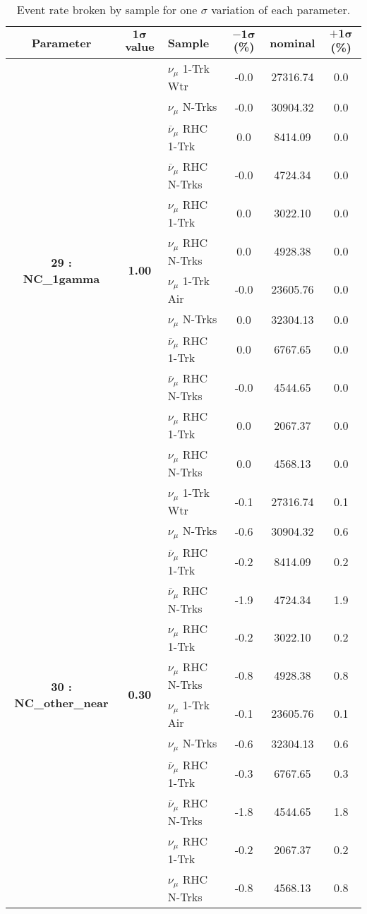 \addtocounter{table}{-1}
\begin{table}[ht!]
\centering
\begin{tabular}{ c  c  l  c  c  c }
\midrule[1.3pt]
\textbf{Parameter} & \textbf{$\mathbf{1\sigma}$ value} & \textbf{Sample} & \textbf{$\mathbf{-1\sigma}$ (\%)}  &  \textbf{nominal}  &  \textbf{$\mathbf{+1\sigma}$ (\%)} \\
\midrule[1.3pt]
\multirow{12}{*}{\textbf{29 : NC\_1gamma}} & \multirow{12}{*}{\textbf{1.00}} & $\nu_\mu$ 1-Trk Wtr &   -0.0 &  27316.74 &   0.0 \\ 
 &  & $\nu_\mu$ N-Trks &   -0.0 &  30904.32 &   0.0 \\ 
 &  & $\overline{\nu}_\mu$ RHC 1-Trk &   0.0 &  8414.09 &   0.0 \\ 
 &  & $\overline{\nu}_\mu$ RHC N-Trks &   -0.0 &  4724.34 &   0.0 \\ 
 &  & $\nu_\mu$ RHC 1-Trk &   0.0 &  3022.10 &   0.0 \\ 
 &  & $\nu_\mu$ RHC N-Trks &   0.0 &  4928.38 &   0.0 \\ 
 &  & $\nu_\mu$ 1-Trk Air &   -0.0 &  23605.76 &   0.0 \\ 
 &  & $\nu_\mu$ N-Trks &   0.0 &  32304.13 &   0.0 \\ 
 &  & $\overline{\nu}_\mu$ RHC 1-Trk &   0.0 &  6767.65 &   0.0 \\ 
 &  & $\overline{\nu}_\mu$ RHC N-Trks &   -0.0 &  4544.65 &   0.0 \\ 
 &  & $\nu_\mu$ RHC 1-Trk &   0.0 &  2067.37 &   0.0 \\ 
 &  & $\nu_\mu$ RHC N-Trks &   0.0 &  4568.13 &   0.0 \\ 
\midrule[1.3pt]
\multirow{12}{*}{\textbf{30 : NC\_other\_near}} & \multirow{12}{*}{\textbf{0.30}} & $\nu_\mu$ 1-Trk Wtr &   -0.1 &  27316.74 &   0.1 \\ 
 &  & $\nu_\mu$ N-Trks &   -0.6 &  30904.32 &   0.6 \\ 
 &  & $\overline{\nu}_\mu$ RHC 1-Trk &   -0.2 &  8414.09 &   0.2 \\ 
 &  & $\overline{\nu}_\mu$ RHC N-Trks &   -1.9 &  4724.34 &   1.9 \\ 
 &  & $\nu_\mu$ RHC 1-Trk &   -0.2 &  3022.10 &   0.2 \\ 
 &  & $\nu_\mu$ RHC N-Trks &   -0.8 &  4928.38 &   0.8 \\ 
 &  & $\nu_\mu$ 1-Trk Air &   -0.1 &  23605.76 &   0.1 \\ 
 &  & $\nu_\mu$ N-Trks &   -0.6 &  32304.13 &   0.6 \\ 
 &  & $\overline{\nu}_\mu$ RHC 1-Trk &   -0.3 &  6767.65 &   0.3 \\ 
 &  & $\overline{\nu}_\mu$ RHC N-Trks &   -1.8 &  4544.65 &   1.8 \\ 
 &  & $\nu_\mu$ RHC 1-Trk &   -0.2 &  2067.37 &   0.2 \\ 
 &  & $\nu_\mu$ RHC N-Trks &   -0.8 &  4568.13 &   0.8 \\ 
\midrule[1.3pt]
\end{tabular}
\centering
\caption{Event rate broken by sample for one $\sigma$ variation of each parameter.}
\end{table}
